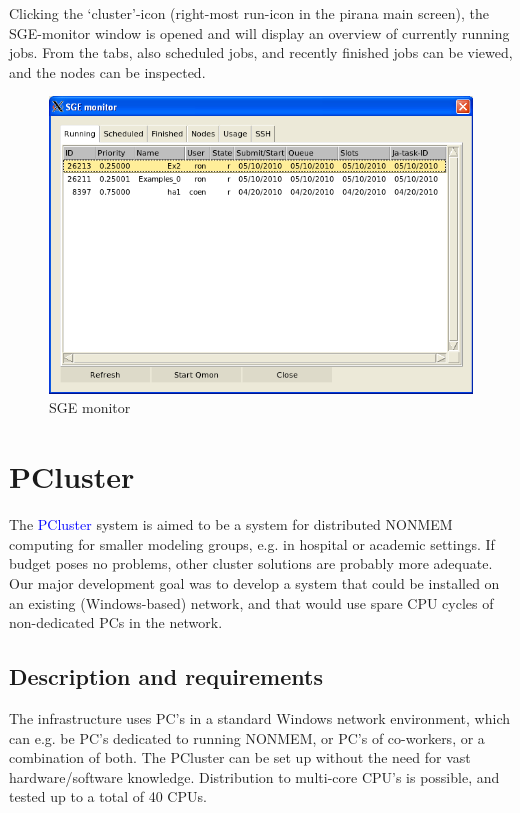 \documentclass[a4,11pt]{report} \usepackage[pdftex]{graphicx}
\begin{document}
{{{Clicking the `cluster'-icon (right-most run-icon in the pirana main
screen), the SGE-monitor window is opened and will display an overview
of currently running jobs. From the tabs, also scheduled jobs, and
recently finished jobs can be viewed, and the nodes can be inspected.

\begin{figure}[hbt] \centering
    \includegraphics[scale=0.5]{images/sge_monitor.png}
    \caption{SGE monitor}
\end{figure}


\section{PCluster} The \textcolor{Blue}{PCluster} system is aimed to
be a system for distributed NONMEM computing for smaller modeling
groups, e.g. in hospital or academic settings. If budget poses no
problems, other cluster solutions are probably more adequate. Our major development goal
was to develop a system that could be installed on an existing
(Windows-based) network, and that would use spare CPU cycles of
non-dedicated PCs in the network.

\subsection{Description and requirements} The infrastructure uses
PC's in a standard Windows network environment, which can e.g. be PC's
dedicated to running NONMEM, or PC's of co-workers, or a combination
of both. The PCluster can be set up without the need for vast
hardware/software knowledge. Distribution to multi-core CPU's is
possible, and tested up to a total of 40 CPUs.

}}}
\end{document}
